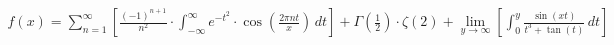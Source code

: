 \documentclass[preview]{standalone}
\begin{document}
\begin{align*}
f(x) = \sum_{n=1}^{\infty} \left[ \frac{(-1)^{n+1}}{n^2} \cdot \int_{-\infty}^{\infty} e^{-t^2} \cdot \cos\left( \frac{2\pi n t}{x} \right) \, dt \right] + \Gamma\left( \frac{1}{2} \right) \cdot \zeta(2) + \lim_{y \to \infty} \left[ \int_{0}^{y} \frac{\sin(x t)}{t^3 + \tan(t)} \, dt \right]
\end{align*}
\end{document}
